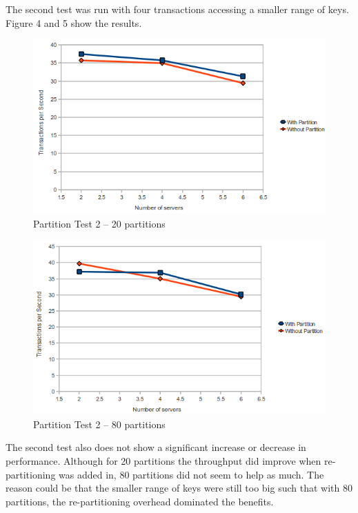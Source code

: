 \documentclass[a4paper, 10pt, notitlepage]{article}
\begin{document}
The second test was run with four transactions accessing a smaller range of keys. Figure 4 and 5 show the results.

\begin{figure}[h!]

  \centering
    \includegraphics[scale=0.7]{peval3.png}
  \caption{Partition Test 2 -- 20 partitions}
\end{figure}

\begin{figure}[h!]

  \centering
    \includegraphics[scale=0.7]{peval4.png}
  \caption{Partition Test 2 -- 80 partitions}
\end{figure}

The second test also does not show a significant increase or decrease in performance. Although for 20 partitions 
the throughput did improve when re-partitioning was added in, 80 partitions did not seem to help as much. The reason
could be that the smaller range of keys were still too big such that with 80 partitions, the re-partitioning
overhead dominated the benefits.
\end{document}
